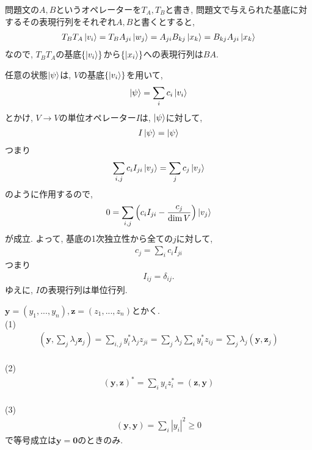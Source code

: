 \begin{ex}
    \label{ex2.1}
    問題文の$A,B$というオペレーターを$T_A, T_B$と書き, 問題文で与えられた基底に対するその表現行列をそれぞれ$A,B$と書くとすると,
    \begin{align*}
        T_B T_A \ket{v_i}
        = T_B A_{ji}\ket{w_j}
        = A_{ji} B_{kj} \ket{x_k}
        = B_{kj} A_{ji} \ket{x_k}
    \end{align*}
    なので, $T_BT_A$の基底$\{\ket{v_i}\}$から$\{\ket{x_i}\}$への表現行列は$BA$.
\end{ex}

\begin{ex}
    \label{ex2.4}
    任意の状態$\ket{\psi}$は, $V$の基底$\{\ket{v_i}\}$を用いて,
    \begin{align*}
        \ket{\psi} = \sum_i c_i \ket{v_i}
    \end{align*}
    とかけ,
    $V \to V$の単位オペレーター$I$は, $\ket{\psi}$に対して,
    \begin{align*}
        I \ket{\psi} = \ket{\psi}
    \end{align*}
    つまり
    \begin{align*}
        \sum_{i,j} c_i I_{ji} \ket{v_j} = \sum_{j} c_j \ket{v_j}
    \end{align*}
    のように作用するので,
    \begin{align*}
        0 =
        \sum_{i,j} \left( c_i I_{ji} - \frac{c_j}{\dim V} \right) \ket{v_j}
    \end{align*}
    が成立. よって, 基底の1次独立性から全ての$j$に対して,
    \begin{align*}
        c_j = \sum_i c_i I_{ji}
    \end{align*}
    つまり
    \begin{align*}
        I_{ij} = \delta_{ij}.
    \end{align*}
    ゆえに, $I$の表現行列は単位行列.
\end{ex}

\begin{ex}
    \label{ex2.5}
    $\bm{y} = (y_1, ..., y_n), \bm{z} = (z_1, ..., z_n)$とかく.
    \\
    (1) \ 
    \begin{align*}
        \left( \bm{y}, \sum_j \lambda_j \bm{z}_j \right)
        = \sum_{i,j} y^{*}_i \lambda_j z_{ji}
        = \sum_j \lambda_j \sum_i y^{*}_i z_{ij}
        = \sum_j \lambda_j (\bm{y},\bm{z}_j)
    \end{align*} 
    \\
    (2) \ 
    \begin{align*}
        \left( \bm{y}, \bm{z}\right)^*
        =
        \sum_i y_i z^*_i
        =
        \left( \bm{z}, \bm{y}\right)
    \end{align*}
    \\
    (3) \ 
    \begin{align*}
        \left( \bm{y}, \bm{y}\right) = \sum_i |y_i|^2 \ge 0
    \end{align*}
    で等号成立は$\bm{y} = \bm{0}$のときのみ.
\end{ex}

